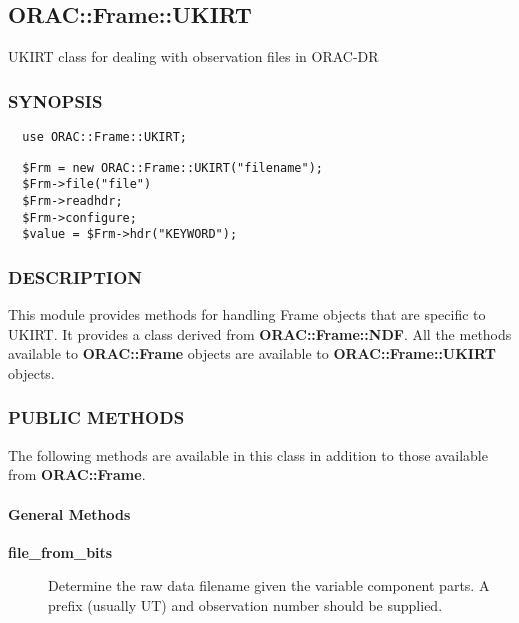 \begin{description}
\begin{description}
\subsection{ORAC::Frame::UKIRT\label{ORAC::Frame::UKIRT}}


UKIRT class for dealing with observation files in ORAC-DR

\subsubsection*{SYNOPSIS\label{ORAC::Frame::UKIRT_SYNOPSIS}}
\begin{verbatim}
  use ORAC::Frame::UKIRT;
\end{verbatim}
\begin{verbatim}
  $Frm = new ORAC::Frame::UKIRT("filename");
  $Frm->file("file")
  $Frm->readhdr;
  $Frm->configure;
  $value = $Frm->hdr("KEYWORD");
\end{verbatim}
\subsubsection*{DESCRIPTION\label{ORAC::Frame::UKIRT_DESCRIPTION}}


This module provides methods for handling Frame objects that
are specific to UKIRT. It provides a class derived from \textbf{ORAC::Frame::NDF}.
All the methods available to \textbf{ORAC::Frame} objects are available
to \textbf{ORAC::Frame::UKIRT} objects.

\subsubsection*{PUBLIC METHODS\label{ORAC::Frame::UKIRT_PUBLIC_METHODS}}


The following methods are available in this class in addition to
those available from \textbf{ORAC::Frame}.

\paragraph*{General Methods\label{ORAC::Frame::UKIRT_General_Methods}}
\begin{description}

\item[{\textbf{file\_from\_bits}}] \mbox{}

Determine the raw data filename given the variable component
parts. A prefix (usually UT) and observation number should
be supplied.


\end{description}
\end{description}
\end{description}
